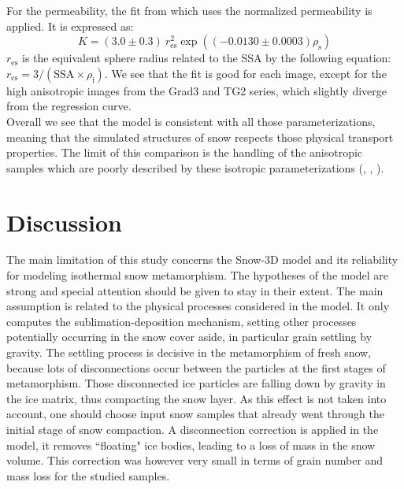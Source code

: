 \documentclass[draft,ms]{agujournal2019}
\begin{document}
 For the permeability, the fit from  which uses the normalized permeability is applied. It is expressed as:
\begin{equation}K=(3.0 \pm 0.3)\ r_{\mathrm{es}}^{2} \exp \left((-0.0130 \pm 0.0003) \rho_{\mathrm{s}}\right)\end{equation}
$r_{\mathrm{es}}$ is the equivalent sphere radius related to the SSA by the following equation: $r_{\mathrm{es}}=3/(\mathrm{SSA} \times \rho_{\mathrm{i}})$.
We see that the fit is good for each image, except for the high anisotropic images from the Grad3 and TG2 series, which slightly diverge from the regression curve.\\

Overall we see that the model is consistent with all those parameterizations, meaning that the simulated structures of snow respects those physical transport properties. The limit of this comparison is the handling of the anisotropic samples which are poorly described by these isotropic parameterizations (, , ). 

\section{Discussion}

The main limitation of this study concerns the Snow-3D model and its reliability for modeling isothermal snow metamorphism. The hypotheses of the model are strong and special attention should be given to stay in their extent. The main assumption is related to the physical processes considered in the model. It only computes the sublimation-deposition mechanism, setting other processes potentially occurring in the snow cover aside, in particular grain settling by gravity. The settling process is decisive in the metamorphism of fresh snow, because lots of disconnections occur between the particles at the first stages of metamorphism. Those disconnected ice particles are falling down by gravity in the ice matrix, thus compacting the snow layer. As this effect is not taken into account, one should choose input snow samples that already went through the initial stage of snow compaction. A disconnection correction is applied in the model, it removes ``floating" ice bodies, leading to a loss of mass in the snow volume. This correction was however very small in terms of grain number and mass loss for the studied samples.\\
\end{document}
